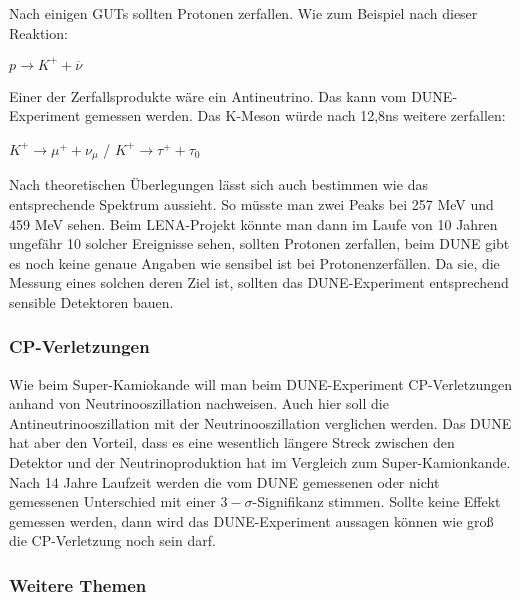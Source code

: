 Nach einigen GUTs sollten Protonen zerfallen. Wie zum Beispiel nach dieser Reaktion:
\begin{center}
$ p \rightarrow K^+ + \overline{\nu} $
\end{center}
Einer der Zerfallsprodukte wäre ein Antineutrino. Das kann vom DUNE-Experiment gemessen werden.
Das K-Meson würde nach 12,8ns weitere zerfallen: 
\begin{center}
    $ K^+ \rightarrow \mu^+ + \nu_\mu $ /  $ K^+ \rightarrow \tau^+ + \tau_0 $
\end{center}

Nach theoretischen Überlegungen lässt sich auch bestimmen wie das entsprechende Spektrum aussieht. 
So müsste man zwei Peaks bei 257 MeV und 459 MeV sehen. Beim LENA-Projekt könnte man dann im
Laufe von 10 Jahren ungefähr 10 solcher Ereignisse sehen, sollten Protonen zerfallen, beim
DUNE gibt es noch keine genaue Angaben wie sensibel ist bei Protonenzerfällen. Da sie, die Messung
eines solchen deren Ziel ist, sollten das DUNE-Experiment entsprechend sensible Detektoren bauen. \cite{Undagoitia2008}

\subsubsection{CP-Verletzungen}

Wie beim Super-Kamiokande will man beim DUNE-Experiment CP-Verletzungen anhand von 
Neutrinooszillation nachweisen. 
Auch hier soll die Antineutrinooszillation mit der Neutrinooszillation verglichen werden. 
Das DUNE hat aber den Vorteil, dass es eine wesentlich längere Streck zwischen den Detektor und der Neutrinoproduktion
hat im Vergleich zum Super-Kamionkande. Nach 14 Jahre Laufzeit werden die vom DUNE gemessenen oder nicht gemessenen
Unterschied mit einer $3-\sigma$-Signifikanz stimmen. Sollte keine Effekt gemessen werden, dann wird das
DUNE-Experiment aussagen können wie groß die CP-Verletzung noch sein darf. 
\cite{Acciarri2016}

\subsubsection{Weitere Themen}

